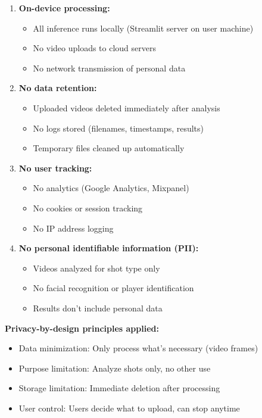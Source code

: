 \documentclass[11pt,a4paper]{article}
\begin{document}
\begin{enumerate}
\item \textbf{On-device processing:}
   \begin{itemize}
   \item All inference runs locally (Streamlit server on user machine)
   \item No video uploads to cloud servers
   \item No network transmission of personal data
   \end{itemize}

\item \textbf{No data retention:}
   \begin{itemize}
   \item Uploaded videos deleted immediately after analysis
   \item No logs stored (filenames, timestamps, results)
   \item Temporary files cleaned up automatically
   \end{itemize}

\item \textbf{No user tracking:}
   \begin{itemize}
   \item No analytics (Google Analytics, Mixpanel)
   \item No cookies or session tracking
   \item No IP address logging
   \end{itemize}

\item \textbf{No personal identifiable information (PII):}
   \begin{itemize}
   \item Videos analyzed for shot type only
   \item No facial recognition or player identification
   \item Results don't include personal data
   \end{itemize}
\end{enumerate}

\textbf{Privacy-by-design principles applied:}
\begin{itemize}
\item Data minimization: Only process what's necessary (video frames)
\item Purpose limitation: Analyze shots only, no other use
\item Storage limitation: Immediate deletion after processing
\item User control: Users decide what to upload, can stop anytime
\end{itemize}
\end{document}
